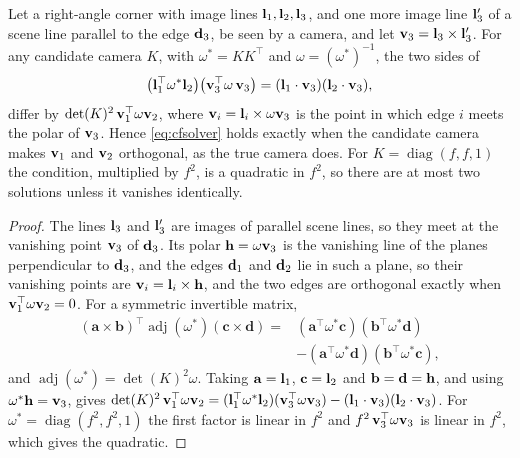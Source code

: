\begin{proposition}\label{prop:quadsolver}
Let a right-angle corner with image lines $\mathbf{l}_1,\mathbf{l}_2,\mathbf{l}_3$, and one more image line $\mathbf{l}_3'$ of a scene line parallel to the edge $\mathbf{d}_3$, be seen by a camera, and let $\mathbf{v}_3=\mathbf{l}_3\times\mathbf{l}_3'$. For any candidate camera $K$, with $\omega^{*}=KK^{\top}$ and $\omega=(\omega^{*})^{-1}$, the two sides of
\begin{equation}
\bigl(\mathbf{l}_1^{\top}\omega^{*}\mathbf{l}_2\bigr)\bigl(\mathbf{v}_3^{\top}\omega\,\mathbf{v}_3\bigr)=(\mathbf{l}_1\cdot\mathbf{v}_3)(\mathbf{l}_2\cdot\mathbf{v}_3),
\label{eq:cfsolver}
\end{equation}
differ by $\det(K)^2\,\mathbf{v}_1^{\top}\omega\mathbf{v}_2$, where $\mathbf{v}_i=\mathbf{l}_i\times\omega\mathbf{v}_3$ is the point in which edge $i$ meets the polar of $\mathbf{v}_3$. Hence \eqref{eq:cfsolver} holds exactly when the candidate camera makes $\mathbf{v}_1$ and $\mathbf{v}_2$ orthogonal, as the true camera does. For $K=\operatorname{diag}(f,f,1)$ the condition, multiplied by $f^2$, is a quadratic in $f^2$, so there are at most two solutions unless it vanishes identically.
\end{proposition}
\begin{proof}
The lines $\mathbf{l}_3$ and $\mathbf{l}_3'$ are images of parallel scene lines, so they meet at the vanishing point $\mathbf{v}_3$ of $\mathbf{d}_3$. Its polar $\mathbf{h}=\omega\mathbf{v}_3$ is the vanishing line of the planes perpendicular to $\mathbf{d}_3$, and the edges $\mathbf{d}_1$ and $\mathbf{d}_2$ lie in such a plane, so their vanishing points are $\mathbf{v}_i=\mathbf{l}_i\times\mathbf{h}$, and the two edges are orthogonal exactly when $\mathbf{v}_1^{\top}\omega\mathbf{v}_2=0$. For a symmetric invertible matrix,
\[
\begin{aligned}
(\mathbf a\times\mathbf b)^{\top}\operatorname{adj}(\omega^{*})(\mathbf c\times\mathbf d)={}&(\mathbf a^{\top}\omega^{*}\mathbf c)(\mathbf b^{\top}\omega^{*}\mathbf d)\\
&-(\mathbf a^{\top}\omega^{*}\mathbf d)(\mathbf b^{\top}\omega^{*}\mathbf c),
\end{aligned}
\]
and $\operatorname{adj}(\omega^{*})=\det(K)^2\omega$. Taking $\mathbf a=\mathbf{l}_1$, $\mathbf c=\mathbf{l}_2$ and $\mathbf b=\mathbf d=\mathbf{h}$, and using $\omega^{*}\mathbf{h}=\mathbf{v}_3$, gives $\det(K)^2\,\mathbf{v}_1^{\top}\omega\mathbf{v}_2=(\mathbf{l}_1^{\top}\omega^{*}\mathbf{l}_2)(\mathbf{v}_3^{\top}\omega\mathbf{v}_3)-(\mathbf{l}_1\cdot\mathbf{v}_3)(\mathbf{l}_2\cdot\mathbf{v}_3)$. For $\omega^{*}=\operatorname{diag}(f^2,f^2,1)$ the first factor is linear in $f^2$ and $f^2\,\mathbf{v}_3^{\top}\omega\mathbf{v}_3$ is linear in $f^2$, which gives the quadratic.
\end{proof}

